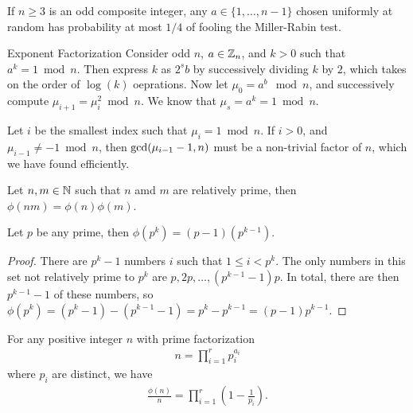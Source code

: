 \begin{defn}
    If $n \geq 3$ is an odd composite integer, any $a \in \{1, \ldots, n-1\}$ chosen uniformly at random has probability at most $1/4$ of fooling the Miller-Rabin test.
\end{defn}

\begin{defn}{Exponent Factorization}\proofbreak
    Consider odd $n$, $a \in \mathbb{Z}_n$, and $k > 0$ such that $a^{k} = 1 \bmod n$. Then express $k$ as $2^{s}b$ by successively dividing $k$ by $2$, which takes on the order of $\log(k)$ oeprations. Now let $\mu_0 = a^{b} \mod n$, and successively compute $\mu_{i+1} = \mu_i^2 \bmod n$. We know that $\mu_s = a^{k} = 1 \bmod n$.

    Let $i$ be the smallest index such that $\mu_i = 1 \bmod n$. If $i > 0$, and $\mu_{i-1} \neq -1 \bmod n$, then $\operatorname{gcd}(\mu_{i-1}-1, n)$ must be a non-trivial factor of $n$, which we have found efficiently.
\end{defn}

\begin{prop}\label{totient-product}
    Let $n, m \in \mathbb{N}$ such that $n$ amd $m$ are relatively prime, then $\phi(nm) = \phi(n)\phi(m)$.
\end{prop}

\begin{prop}\label{totient-power}
    Let $p$ be any prime, then $\phi(p^{k}) = (p-1)(p^{k-1})$.
\end{prop}

\begin{proof}
    There are $p^{k}-1$ numbers $i$ such that $1 \leq i < p^{k}$. The only numbers in this set not relatively prime to $p^{k}$ are $p, 2p, \ldots, (p^{k-1}-1)p$. In total, there are then $p^{k-1}-1$ of these numbers, so $\phi(p^{k}) = \left(p^{k}-1\right) - \left(p^{k-1}-1\right) = p^{k} - p^{k-1} = (p - 1)p^{k-1}$.
\end{proof}

\begin{thm}\label{totient-prime-factorization}
    For any positive integer $n$ with prime factorization
    \begin{align*}
        n = \prod_{i=1}^{r}p_i^{a_i}
    \end{align*}
    where $p_i$ are distinct, we have
    \begin{align*}
        \frac{\phi(n)}{n} = \prod_{i=1}^{r}\left(1 - \frac{1}{p_i}\right).
    \end{align*}
\end{thm}

